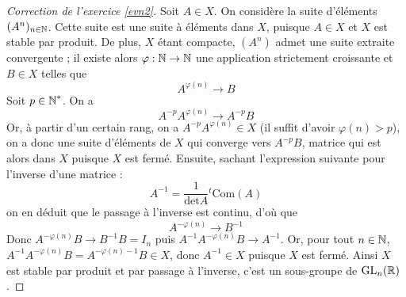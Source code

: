 \begin{proof}[Correction de l'exercice \ref{evn2}]
    Soit $A\in X$. On considère la suite d'éléments $(A^n)_{n\in\operatorname{\mathbb N}}$.
    Cette suite est une suite à éléments dans $X$, puisque $A\in X$ et $X$ est stable par produit. 
    De plus, $X$ étant compacte, $(A^n)$ admet une suite extraite convergente ; 
    il existe alors $\varphi : \operatorname{\mathbb N}\to\operatorname{\mathbb N}$ une application strictement croissante et $B\in X$ telles que \[A^{\varphi(n)}\longrightarrow B\]
    Soit $p\in\operatorname{\mathbb N}^*$. On a \[A^{-p}A^{\varphi(n)}\longrightarrow A^{-p}B\]
    Or, à partir d'un certain rang, on a $A^{-p}A^{\varphi(n)}\in X$ (il suffit d'avoir $\varphi(n)>p$), 
    on a donc une suite d'éléments de $X$ qui converge vers $A^{-p}B$, matrice qui est alors dans $X$ puisque $X$ est fermé. 
    Ensuite, sachant l'expression suivante pour l'inverse d'une matrice : \[A^{-1}=\frac1{\text{det}A}{}^t\text{Com}(A)\]
    on en déduit que le passage à l'inverse est continu, d'où que \[A^{-\varphi(n)}\longrightarrow B^{-1}\]
    Donc $A^{-\varphi(n)}B\longrightarrow B^{-1}B=I_n$ puis $A^{-1}A^{-\varphi(n)}B\longrightarrow A^{-1}$. 
    Or, pour tout $n\in\operatorname{\mathbb N}$, $A^{-1}A^{-\varphi(n)}B=A^{-\varphi(n)-1}B\in X$, donc $A^{-1}\in X$ puisque $X$ est fermé. 
    Ainsi $X$ est stable par produit et par passage à l'inverse, c'est un sous-groupe de $\operatorname{GL}_n(\operatorname{\mathbb R})$.
\end{proof}
    

